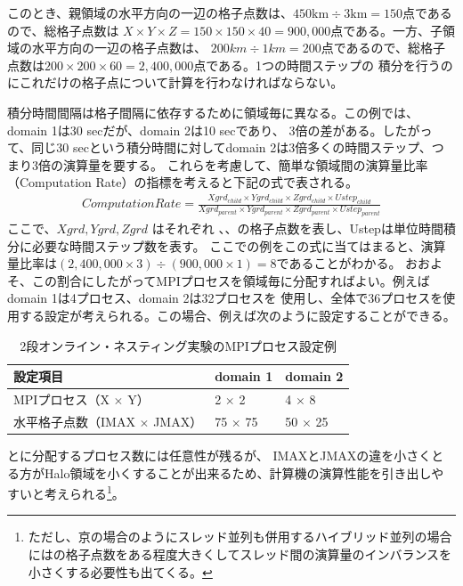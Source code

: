 このとき、親領域の水平方向の一辺の格子点数は、$450 \mathrm{km} \div 3 \mathrm{km} = 150$点であるので、総格子点数は
$X \times Y \times Z = 150 \times 150 \times 40 = 900,000$点である。一方、子領域の水平方向の一辺の格子点数は、
$200 km \div 1 km = 200$点であるので、総格子点数は$200 \times 200 \times 60 = 2,400,000$点である。1つの時間ステップの
積分を行うのにこれだけの格子点について計算を行わなければならない。

積分時間間隔は格子間隔に依存するために領域毎に異なる。この例では、domain 1は30 secだが、domain 2は10 secであり、
3倍の差がある。したがって、同じ30 secという積分時間に対してdomain 2は3倍多くの時間ステップ、つまり3倍の演算量を要する。
これらを考慮して、簡単な領域間の演算量比率（Computation Rate）の指標を考えると下記の式で表される。
\begin{eqnarray}
ComputationRate=\frac{Xgrd_{child} \times Ygrd_{child} \times Zgrd_{child} \times Ustep_{child}}
                     {Xgrd_{parent} \times Ygrd_{parent} \times Zgrd_{parent} \times Ustep_{parent}} \nonumber
\end{eqnarray}
ここで、$Xgrd, Ygrd, Zgrd$ はそれぞれ{\XDIR} 、{\YDIR}、{\ZDIR}の格子点数を表し、Ustepは単位時間積分に必要な時間ステップ数を表す。
ここでの例をこの式に当てはまると、演算量比率は$(2,400,000 \times 3) \div (900,000 \times 1) = 8$であることがわかる。
おおよそ、この割合にしたがってMPIプロセスを領域毎に分配すればよい。例えばdomain 1は4プロセス、domain 2は32プロセスを
使用し、全体で36プロセスを使用する設定が考えられる。この場合、例えば次のように設定することができる。

\begin{table}[htb]
\begin{center}
\caption{2段オンライン・ネスティング実験のMPIプロセス設定例}
\begin{tabularx}{150mm}{|l|l|X|} \hline
 \rowcolor[gray]{0.9} 設定項目 & domain 1 & domain 2 \\ \hline
 MPIプロセス（X $\times$ Y） & 2 $\times$ 2 & 4 $\times$ 8 \\ \hline
 水平格子点数（IMAX $\times$ JMAX） & 75 $\times$ 75 & 50 $\times$ 25 \\ \hline
\end{tabularx}
\label{tab:nest_proc_guide2}
\end{center}
\end{table}

{\XDIR} と{\YDIR}に分配するプロセス数には任意性が残るが、
IMAXとJMAXの違を小さくとる方がHalo領域を小くすることが出来るため、計算機の演算性能を引き出しやすいと考えられる\footnote{ただし、京の場合のようにスレッド並列も併用するハイブリッド並列の場合には{\YDIR}の格子点数をある程度大きくしてスレッド間の演算量のインバランスを小さくする必要性も出てくる。}。

